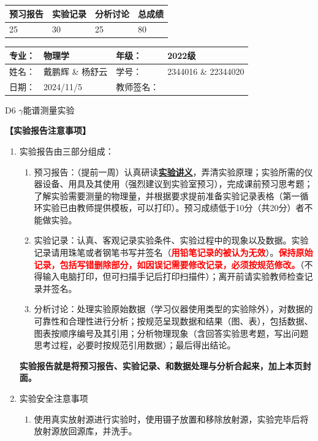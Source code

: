 \documentclass[dvipsnames, svgnames,a4paper,11pt]{article}
\begin{document}
\begin{table}
	\renewcommand\arraystretch{1.7}
	\begin{tabularx}{\textwidth}{
		|X|X|X|X
		|X|X|X|X|}
	\hline
	\multicolumn{2}{|c|}{预习报告}&\multicolumn{2}{|c|}{实验记录}&\multicolumn{2}{|c|}{分析讨论}&\multicolumn{2}{|c|}{总成绩}\\
	\hline
	\LARGE25 & & \LARGE30 & & \LARGE25 & & \LARGE80 & \\
	\hline
	\end{tabularx}
\end{table}


\begin{table}
	\renewcommand\arraystretch{1.7}
	\begin{tabularx}{\textwidth}{|X|X|X|X|}
	\hline
	专业：& 物理学 &年级：& 2022级\\
	\hline
	姓名：& 戴鹏辉 \& 杨舒云  & 学号： & 2344016 \& 22344020 \\
	\hline
	日期：& 2024/11/5 & 教师签名：& \\
	\hline
	\end{tabularx}
\end{table}

\begin{center}
	\LARGE D6 \quad $\gamma$能谱测量实验
\end{center}

\textbf{【实验报告注意事项】}
\begin{enumerate}
	\item 实验报告由三部分组成：
	\begin{enumerate}
		\item 预习报告：（提前一周）认真研读\underline{\textbf{实验讲义}}，弄清实验原理；实验所需的仪器设备、用具及其使用（强烈建议到实验室预习），完成课前预习思考题；了解实验需要测量的物理量，并根据要求提前准备实验记录表格（第一循环实验已由教师提供模板，可以打印）。预习成绩低于10分（共20分）者不能做实验。
	    \item 实验记录：认真、客观记录实验条件、实验过程中的现象以及数据。实验记录请用珠笔或者钢笔书写并签名（\textcolor{red}{\textbf{用铅笔记录的被认为无效}}）。\textcolor{red}{\textbf{保持原始记录，包括写错删除部分，如因误记需要修改记录，必须按规范修改。}}（不得输入电脑打印，但可扫描手记后打印扫描件）；离开前请实验教师检查记录并签名。
	    \item 分析讨论：处理实验原始数据（学习仪器使用类型的实验除外），对数据的可靠性和合理性进行分析；按规范呈现数据和结果（图、表），包括数据、图表按顺序编号及其引用；分析物理现象（含回答实验思考题，写出问题思考过程，必要时按规范引用数据）；最后得出结论。
	\end{enumerate}
	\textbf{实验报告就是将预习报告、实验记录、和数据处理与分析合起来，加上本页封面。}
	\item 实验安全注意事项
		\begin{enumerate}[label=\roman*.]
			\item 使用真实放射源进行实验时，使用镊子放置和移除放射源，实验完毕后将放射源放回源库，并洗手。
		\end{enumerate}
\end{enumerate}
\end{document}
